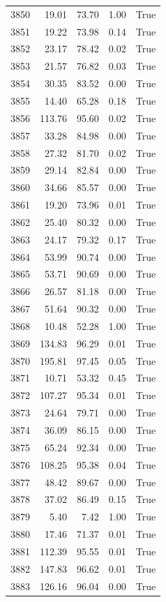 \begin{longtable}{rrrrr}
3850 & 19.01 & 73.70 & 1.00 & True \\
3851 & 19.22 & 73.98 & 0.14 & True \\
3852 & 23.17 & 78.42 & 0.02 & True \\
3853 & 21.57 & 76.82 & 0.03 & True \\
3854 & 30.35 & 83.52 & 0.00 & True \\
3855 & 14.40 & 65.28 & 0.18 & True \\
3856 & 113.76 & 95.60 & 0.02 & True \\
3857 & 33.28 & 84.98 & 0.00 & True \\
3858 & 27.32 & 81.70 & 0.02 & True \\
3859 & 29.14 & 82.84 & 0.00 & True \\
3860 & 34.66 & 85.57 & 0.00 & True \\
3861 & 19.20 & 73.96 & 0.01 & True \\
3862 & 25.40 & 80.32 & 0.00 & True \\
3863 & 24.17 & 79.32 & 0.17 & True \\
3864 & 53.99 & 90.74 & 0.00 & True \\
3865 & 53.71 & 90.69 & 0.00 & True \\
3866 & 26.57 & 81.18 & 0.00 & True \\
3867 & 51.64 & 90.32 & 0.00 & True \\
3868 & 10.48 & 52.28 & 1.00 & True \\
3869 & 134.83 & 96.29 & 0.01 & True \\
3870 & 195.81 & 97.45 & 0.05 & True \\
3871 & 10.71 & 53.32 & 0.45 & True \\
3872 & 107.27 & 95.34 & 0.01 & True \\
3873 & 24.64 & 79.71 & 0.00 & True \\
3874 & 36.09 & 86.15 & 0.00 & True \\
3875 & 65.24 & 92.34 & 0.00 & True \\
3876 & 108.25 & 95.38 & 0.04 & True \\
3877 & 48.42 & 89.67 & 0.00 & True \\
3878 & 37.02 & 86.49 & 0.15 & True \\
3879 & 5.40 & 7.42 & 1.00 & True \\
3880 & 17.46 & 71.37 & 0.01 & True \\
3881 & 112.39 & 95.55 & 0.01 & True \\
3882 & 147.83 & 96.62 & 0.01 & True \\
3883 & 126.16 & 96.04 & 0.00 & True \\

\end{longtable}
